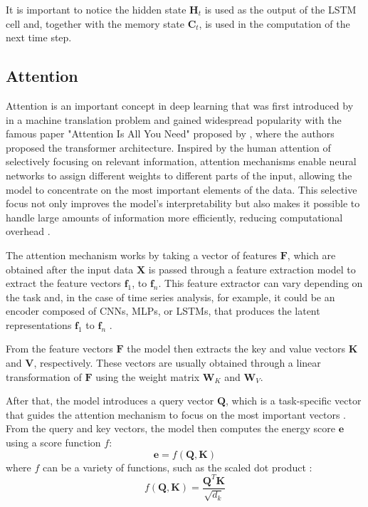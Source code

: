 It is important to notice the hidden state $\boldsymbol{H}_t$ is used as the output of the LSTM cell and, together with the memory state $\boldsymbol{C}_t$, is used in the computation of the next time step.

\subsection{Attention} \label{sec-attention}

Attention is an important concept in deep learning that was first introduced by \cite{bahdanau2016neuralmachinetranslationjointly} in a machine translation problem and gained widespread popularity with the famous paper "Attention Is All You Need" proposed by \cite{vaswani2023attentionneed}, where the authors proposed the transformer architecture. Inspired by the human attention of selectively focusing on relevant information, attention mechanisms enable neural networks to assign different weights to different parts of the input, allowing the model to concentrate on the most important elements of the data. This selective focus not only improves the model's interpretability but also makes it possible to handle large amounts of information more efficiently, reducing computational overhead \cite{NIU202148}.

The attention mechanism works by taking a vector of features $\boldsymbol{F}$, which are obtained after the input data $\boldsymbol{X}$ is passed through a feature extraction model to extract the feature vectors $\boldsymbol{f}_1$, to $\boldsymbol{f}_n$. This feature extractor can vary depending on the task and, in the case of time series analysis, for example, it could be an encoder composed of CNNs, MLPs, or LSTMs, that produces the latent representations $\boldsymbol{f}_1$ to $\boldsymbol{f}_n$ \cite{Brauwers_2023}.

From the feature vectors $\boldsymbol{F}$ the model then extracts the key and value vectors $\boldsymbol{K}$ and $\boldsymbol{V}$, respectively. These vectors are usually obtained through a linear transformation of $\boldsymbol{F}$ using the weight matrix $\boldsymbol{W}_K$ and $\boldsymbol{W}_V$.

After that, the model introduces a query vector $\boldsymbol{Q}$, which is a task-specific vector that guides the attention mechanism to focus on the most important vectors \cite{Brauwers_2023,NIU202148}. From the query and key vectors, the model then computes the energy score $\boldsymbol{e}$ using a score function $f$:
\begin{equation}
    \boldsymbol{e} = f\left(\boldsymbol{Q},\boldsymbol{K}\right)
\end{equation}
where $f$ can be a variety of functions, such as the scaled dot product \cite{vaswani2023attentionneed}:
\begin{equation}
    f\left(\boldsymbol{Q},\boldsymbol{K}\right) = \frac{\boldsymbol{Q}^T \boldsymbol{K}}{\sqrt{d_k}}
\end{equation}

